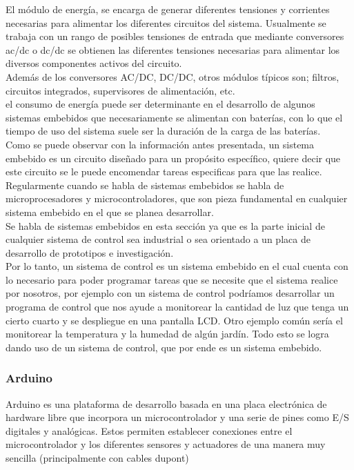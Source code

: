 \documentclass[12pt,titlepage]{article}
\begin{document}
El módulo de energía, se encarga de generar diferentes tensiones y corrientes necesarias para alimentar los diferentes circuitos del sistema. Usualmente se trabaja con un rango de posibles tensiones de entrada que mediante conversores ac/dc o dc/dc se obtienen las diferentes tensiones necesarias para alimentar los diversos componentes activos del circuito. \\[0.8mm]

Además de los conversores AC/DC, DC/DC, otros módulos típicos son; filtros, circuitos integrados, supervisores de alimentación, etc. \\ [0.8mm]
el consumo de energía puede ser determinante en el desarrollo de algunos sistemas embebidos que necesariamente se alimentan con baterías, con lo que el tiempo de uso del sistema suele ser la duración de la carga de las baterías.\\[2.8mm]

Como se puede observar con la información antes presentada, un sistema embebido es un circuito diseñado para un propósito específico, quiere decir que este circuito se le puede encomendar tareas especificas para que las realice. Regularmente cuando se habla de sistemas embebidos se habla de microprocesadores y microcontroladores, que son pieza fundamental en cualquier sistema embebido en el que se planea desarrollar.\\[0.8mm]

Se habla de sistemas embebidos en esta sección ya que es la parte inicial de cualquier sistema de control sea industrial o sea orientado a un placa de desarrollo de prototipos e investigación. \\[0.8mm]

Por lo tanto, un sistema de control es un sistema embebido en el cual cuenta con lo necesario para poder programar tareas que se necesite que el sistema realice por nosotros, por ejemplo con un sistema de control podríamos desarrollar un programa de control que nos ayude a monitorear la cantidad de luz que tenga un cierto cuarto y se despliegue en una pantalla LCD. Otro ejemplo común sería el monitorear la temperatura y la humedad de algún jardín. Todo esto se logra dando uso de un sistema de control, que por ende es un sistema embebido. \\[0.8mm]

\subsubsection{Arduino}
Arduino es una plataforma de desarrollo basada en una placa electrónica de hardware libre que incorpora un microcontrolador y una serie de pines como E/S digitales y analógicas. Estos permiten establecer conexiones entre el microcontrolador y los diferentes sensores y actuadores de una manera muy sencilla (principalmente con cables dupont)\\[0.8mm]
\end{document}
